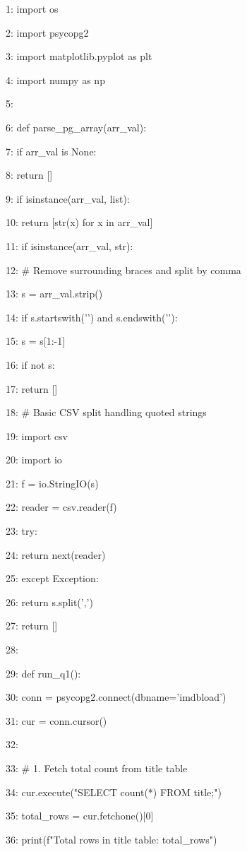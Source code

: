 \documentclass[11pt,a4paper]{article}
\begin{document}
{1: import os

2: import psycopg2

3: import matplotlib.pyplot as plt

4: import numpy as np

5:

6: def parse\_pg\_array(arr\_val):

7:     if arr\_val is None:

8:         return []

9:     if isinstance(arr\_val, list):

10:         return [str(x) for x in arr\_val]

11:     if isinstance(arr\_val, str):

12:         \# Remove surrounding braces { } and split by comma

13:         s = arr\_val.strip()

14:         if s.startswith('{') and s.endswith('}'):

15:             s = s[1:-1]

16:         if not s:

17:             return []

18:         \# Basic CSV split handling quoted strings

19:         import csv

20:         import io

21:         f = io.StringIO(s)

22:         reader = csv.reader(f)

23:         try:

24:             return next(reader)

25:         except Exception:

26:             return s.split(',')

27:     return []

28:

29: def run\_q1():

30:     conn = psycopg2.connect(dbname='imdbload')

31:     cur = conn.cursor()

32:

33:     \# 1. Fetch total count from title table

34:     cur.execute("SELECT count(*) FROM title;")

35:     total\_rows = cur.fetchone()[0]

36:     print(f"Total rows in title table: {total\_rows}")

}
\end{document}
